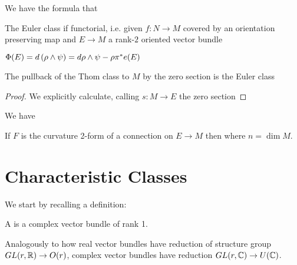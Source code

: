\documentclass{article}
\begin{document}
\begin{prop}
	We have the formula that 
\end{prop}

\begin{corollary}
	The Euler class if functorial, i.e.  given $f:N \to M$ covered by an orientation preserving map and $E \to M$ a rank-$2$ oriented vector bundle 
\end{corollary}

\begin{prop}
	$\Phi(E) = d\left( \rho \wedge \psi \right) = d\rho \wedge \psi - \rho \pi^\ast e(E)$
\end{prop}
\begin{corollary}
	The pullback of the Thom class to $M$ by the zero section is the Euler class
\end{corollary}
\begin{proof}
	We explicitly calculate, calling $s:M \to E$ the zero section 
\end{proof}

\begin{theorem}
	We have
\end{theorem}

\begin{prop}
	If $F$ is the curvature 2-form of a connection on $E\to M$ then 
where $n=\dim M$. 
\end{prop}

\section{Characteristic Classes}

We start by recalling a definition:

\begin{definition}
	A  is a complex vector bundle of rank 1.
\end{definition}

\begin{remark}
	Analogously to how real vector bundles have reduction of structure group $GL(r,\mathbb{R}) \to O(r)$, complex vector bundles have reduction $GL(r,\mathbb{C})\to U(\mathbb{C})$.
\end{remark}
\end{document}
